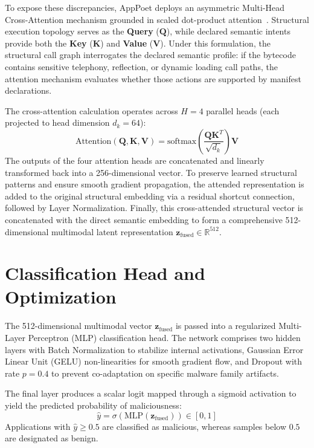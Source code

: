 \documentclass[12pt,a4paper,oneside]{report}
\begin{document}
To expose these discrepancies, AppPoet deploys an asymmetric Multi-Head Cross-Attention mechanism grounded in scaled dot-product attention~\cite{ref12}. Structural execution topology serves as the \textbf{Query} ($\mathbf{Q}$), while declared semantic intents provide both the \textbf{Key} ($\mathbf{K}$) and \textbf{Value} ($\mathbf{V}$). Under this formulation, the structural call graph interrogates the declared semantic profile: if the bytecode contains sensitive telephony, reflection, or dynamic loading call paths, the attention mechanism evaluates whether those actions are supported by manifest declarations.

The cross-attention calculation operates across $H = 4$ parallel heads (each projected to head dimension $d_k = 64$):
\begin{equation}
    \text{Attention}(\mathbf{Q}, \mathbf{K}, \mathbf{V}) = \text{softmax}\left( \frac{\mathbf{Q} \mathbf{K}^T}{\sqrt{d_k}} \right) \mathbf{V}
\end{equation}
The outputs of the four attention heads are concatenated and linearly transformed back into a 256-dimensional vector. To preserve learned structural patterns and ensure smooth gradient propagation, the attended representation is added to the original structural embedding via a residual shortcut connection, followed by Layer Normalization. Finally, this cross-attended structural vector is concatenated with the direct semantic embedding to form a comprehensive 512-dimensional multimodal latent representation $\mathbf{z}_{\text{fused}} \in \mathbb{R}^{512}$.

\section{Classification Head and Optimization}
The 512-dimensional multimodal vector $\mathbf{z}_{\text{fused}}$ is passed into a regularized Multi-Layer Perceptron (MLP) classification head. The network comprises two hidden layers with Batch Normalization to stabilize internal activations, Gaussian Error Linear Unit (GELU) non-linearities for smooth gradient flow, and Dropout with rate $p = 0.4$ to prevent co-adaptation on specific malware family artifacts.

The final layer produces a scalar logit mapped through a sigmoid activation to yield the predicted probability of maliciousness:
\begin{equation}
    \hat{y} = \sigma\left(\text{MLP}(\mathbf{z}_{\text{fused}})\right) \in [0, 1]
\end{equation}
Applications with $\hat{y} \ge 0.5$ are classified as malicious, whereas samples below $0.5$ are designated as benign.
\end{document}
